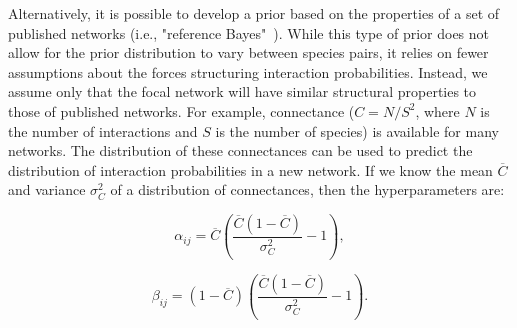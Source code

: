 \documentclass[12pt]{article}
\begin{document}
\begin{spacing}{2.0}
        Alternatively, it is possible to develop a prior based on the properties of a set of published networks (i.e., "reference Bayes"~\citet{Spiegelhalter2000}). While this type of prior does not allow for the prior distribution to vary between species pairs, it relies on fewer assumptions about the forces structuring interaction probabilities. Instead, we assume only that the focal network will have similar structural properties to those of published networks. For example, connectance ($C=N/S^2$, where $N$ is the number of interactions and $S$ is the number of species) is available for many networks. The distribution of these connectances can be used to predict the distribution of interaction probabilities in a new network. If we know the mean $\overline{C}$ and variance $\sigma_C^2$ of a distribution of connectances, then the hyperparameters are:

        \begin{equation}
        \alpha_{ij} = \overline{C}(\frac{\overline{C}(1-\overline{C})}{\sigma_C^2}-1) ,
        \end{equation}

        \begin{equation}
        \beta_{ij} = (1-\overline{C})(\frac{\overline{C}(1-\overline{C})}{\sigma_C^2}-1) .
        \end{equation}
  


\end{spacing}
\end{document}
